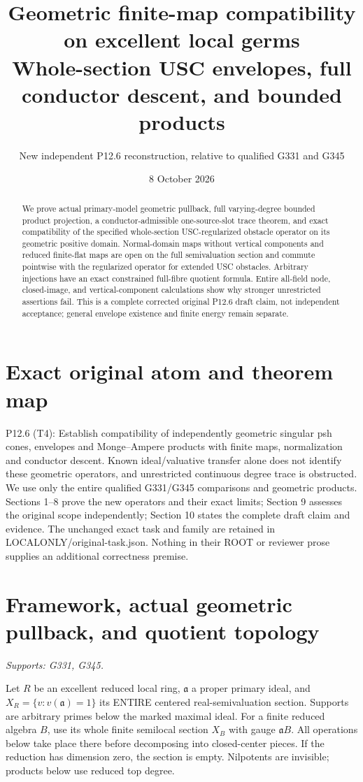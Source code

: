 \documentclass[11pt]{article}
\title{Geometric finite-map compatibility on excellent local germs\\Whole-section USC envelopes, full conductor descent, and bounded products}
\author{New independent P12.6 reconstruction, relative to qualified G331 and G345}
\date{8 October 2026}
\begin{document}
\maketitle
\begin{abstract}
We prove actual primary-model geometric pullback, full varying-degree bounded
product projection, a conductor-admissible one-source-slot trace theorem,
and exact compatibility of the specified whole-section USC-regularized
obstacle operator on its geometric positive domain. Normal-domain maps without
vertical components and reduced finite-flat maps are open on the full
semivaluation section and commute pointwise with the regularized operator
for extended USC obstacles. Arbitrary injections have an exact constrained
full-fibre quotient formula. Entire all-field node, closed-image, and
vertical-component calculations show why stronger unrestricted assertions
fail. This is a complete corrected original P12.6 draft claim, not independent
acceptance; general envelope existence and finite energy remain separate.
\end{abstract}
\section*{Exact original atom and theorem map}
P12.6 (T4): Establish compatibility of independently geometric singular psh
cones, envelopes and Monge--Ampere products with finite maps, normalization
and conductor descent. Known ideal/valuative transfer alone does not identify
these geometric operators, and unrestricted continuous degree trace is
obstructed. We use only the entire qualified G331/G345 comparisons and
geometric products. Sections 1--8 prove the new operators and their exact
limits; Section 9 assesses the original scope independently; Section 10
states the complete draft claim and evidence. The unchanged exact task and
family are retained in LOCALONLY/original-task.json. Nothing in their ROOT
or reviewer prose supplies an additional correctness premise.
\tableofcontents
\section{Framework, actual geometric pullback, and quotient topology}
\textit{Supports: G331, G345.}

Let $R$ be an excellent reduced local ring, $\mathfrak a$ a proper primary ideal, and $X_R=\{v:v(\mathfrak a)=1\}$ its ENTIRE centered real-semivaluation section. Supports are arbitrary primes below the marked maximal ideal. For a finite reduced algebra $B$, use its whole finite semilocal section $X_B$ with gauge $\mathfrak aB$. All operations below take place there before decomposing into closed-center pieces. If the reduction has dimension zero, the section is empty. Nilpotents are invisible; products below use reduced top degree.
\end{document}
